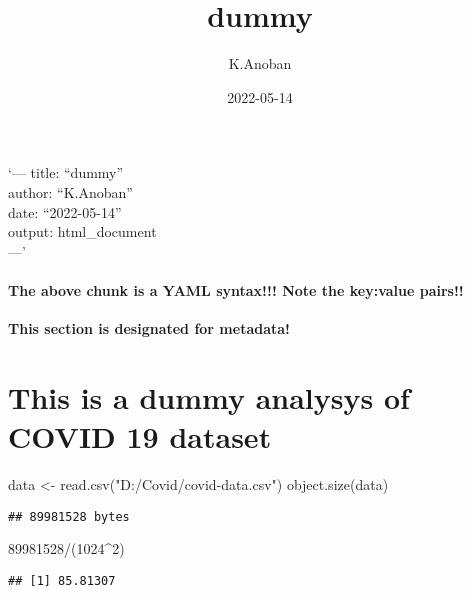 \documentclass[
]{article}
\title{dummy}
\author{K.Anoban}
\date{2022-05-14}
\newenvironment{Shaded}{\begin{snugshade}}{\end{snugshade}}
\newcommand{\DecValTok}[1]{\textcolor[rgb]{0.00,0.00,0.81}{#1}}
\newcommand{\FunctionTok}[1]{\textcolor[rgb]{0.00,0.00,0.00}{#1}}
\newcommand{\NormalTok}[1]{#1}
\newcommand{\OtherTok}[1]{\textcolor[rgb]{0.56,0.35,0.01}{#1}}
\newcommand{\SpecialCharTok}[1]{\textcolor[rgb]{0.00,0.00,0.00}{#1}}
\newcommand{\StringTok}[1]{\textcolor[rgb]{0.31,0.60,0.02}{#1}}
\begin{document}
\maketitle

`--- title: ``dummy''\\
author: ``K.Anoban''\\
date: ``2022-05-14''\\
output: html\_document\\
---'

\hypertarget{the-above-chunk-is-a-yaml-syntax-note-the-keyvalue-pairs}{%
\paragraph{\texorpdfstring{\textbf{The above chunk is a YAML syntax!!!
Note the key:value
pairs!!}}{The above chunk is a YAML syntax!!! Note the key:value pairs!!}}\label{the-above-chunk-is-a-yaml-syntax-note-the-keyvalue-pairs}}

\textbf{This section is designated for metadata!}

\hypertarget{this-is-a-dummy-analysys-of-covid-19-dataset}{%
\section{This is a dummy analysys of COVID 19
dataset}\label{this-is-a-dummy-analysys-of-covid-19-dataset}}

\begin{Shaded}
\begin{Highlighting}[]
\NormalTok{data }\OtherTok{\textless{}{-}} \FunctionTok{read.csv}\NormalTok{(}\StringTok{"D:/Covid/covid{-}data.csv"}\NormalTok{)}
\FunctionTok{object.size}\NormalTok{(data)}
\end{Highlighting}
\end{Shaded}

\begin{verbatim}
## 89981528 bytes
\end{verbatim}

\begin{Shaded}
\begin{Highlighting}[]
\DecValTok{89981528}\SpecialCharTok{/}\NormalTok{(}\DecValTok{1024}\SpecialCharTok{\^{}}\DecValTok{2}\NormalTok{)}
\end{Highlighting}
\end{Shaded}

\begin{verbatim}
## [1] 85.81307
\end{verbatim}
\end{document}
